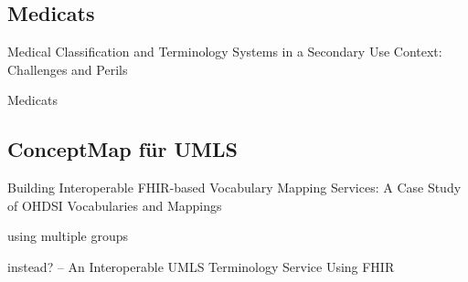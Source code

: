 

\begin{comment}
\subsection{Normen für Mappings}

Health Informatics, Terminology resource map quality measures (MapQual) \cite{ISO21564}


Health informatics -- Principles of mapping between terminological resources \cite{ISO12300}

\bibitem{WHO-FIC-Class}
``WHO-FIC Classifications and Terminology Mapping -- Principles and Best Practice'' \newline
\url{https://cdn.who.int/media/docs/default-source/classification/who-fic-network/whofic_terminology_mapping_guide.pdf?sfvrsn=2cae387c_7&download=true}

^ Qualität
\end{comment}


\subsection{Medicats}

Medical Classification and Terminology Systems in a Secondary Use Context: Challenges and Perils \cite{hund}

Medicats \cite{medicats}

\subsection{ConceptMap für UMLS}

Building Interoperable FHIR-based Vocabulary Mapping Services:
A Case Study of OHDSI Vocabularies and Mappings

using multiple groups \cite{saripalle2019representing}

instead? -- An Interoperable UMLS Terminology Service Using FHIR 

